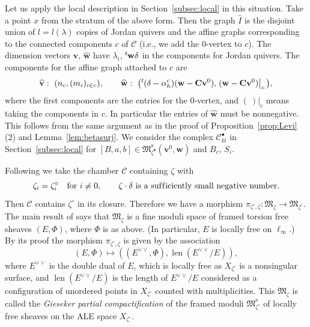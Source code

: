 \documentclass[pdftex]{sigma}
\theoremstyle{definition}
\numberwithin{equation}{section}
\newcommand{\lemref}[1]{Lemma~\ref{#1}}
\newcommand{\propref}[1]{Proposition~\ref{#1}}
\newcommand{\subsecref}[1]{Section~\ref{#1}}
\newcommand{\lsp}[2]{{\mskip-.3mu}{}^{#1}\mskip-1mu{#2}}
\newcommand{\M}{{\mathfrak M}} %
\newcommand{\Mreg}{\M^{\operatorname{s}}}
\newcommand{\bv}{{\mathbf v}} %
\newcommand{\bw}{{\mathbf w}} %
\newcommand{\bC}{{\mathbf C}} %
\newcommand{\linf}{\ell_\infty}
\begin{document}
Let us apply the local description in \subsecref{subsec:local} in this
situation. Take a point $x$ from the stratum of the above form. Then
the graph $\widehat{I}$ is the disjoint union of $l = l(\lambda)$
copies of Jordan quivers and the af\/f\/ine graphs corresponding to the
connected components $c$ of $\mathcal C$ (i.e., we add the $0$-vertex
to $c$).  The dimension vectors $\widehat{\bv}$, $\widehat{\bw}$ have
$\lambda_i$, $\lsp{t}{\bw}\delta$ in the components for Jordan
quivers. The components for the af\/f\/ine graph attached to $c$ are
\begin{equation}\label{eq:hatdim}
   \widehat{\bv} : \ (n_c, (m_i)_{i\in c}), \qquad
   \widehat{\bw} : \ \big( \lsp{t}{(\delta-\alpha^c_h)}(\bw - \bC\bv^0),
   \left.(\bw - \bC\bv^0)\right|_c\big),
\end{equation}
where the f\/irst components are the entries for the $0$-vertex, and
$\left.(\ )\right|_c$ means taking the components in $c$.
In particular the entries of $\widehat\bw$ must be nonnegative. This
follows from the same argument as in the proof of
\propref{prop:Levi}(2) and \lemref{lem:betasurj}. We consider the
complex $\mathscr{C}^\bullet_{kl}$ in \subsecref{subsec:local} for
$[B,a,b]\in \Mreg_{\zeta^\bullet}(\bv^0, \bw)$ and $B_c$, $S_i$.

Following \cite{Na-ADHM} we take the chamber $\mathcal C$ containing
$\zeta$ with
\begin{equation}\label{eq:zetasheaf}
   \zeta_i = \zeta_i^\circ \quad \text{for $i\neq 0$}, \qquad
   \text{$\zeta\cdot\delta$ is a suf\/f\/iciently small negative number}.
\end{equation}
Then $\mathcal C$ contains $\zeta^\circ$ in its closure. Therefore we
have a morphism $\pi_{\zeta^\circ,\zeta}\colon \M_{\zeta}\to
\M_{\zeta^\circ}$. The main result of \cite{Na-ADHM} says that
$\M_{\zeta}$ is a f\/ine moduli space of framed torsion free sheaves
$(E,\Phi)$, where $\Phi$ is as above. (In particular, $E$ is locally
free on $\linf$.) By its proof the morphism $\pi_{\zeta^\circ,\zeta}$
is given by the association
\[
   (E,\Phi) \mapsto ((E^{\vee\vee},\Phi), \operatorname{len}(E^{\vee\vee}/E)),
\]
where $E^{\vee\vee}$ is the double dual of $E$, which is locally free
as $X_{\zeta^\circ}$ is a nonsingular surface, and
$\operatorname{len}(E^{\vee\vee}/E)$ is the length of $E^{\vee\vee}/E$
considered as a conf\/iguration of unordered points in $X_{\zeta^\circ}$
counted with multiplicities.
This $\M_{\zeta}$ is called the {\it Gieseker partial
  compactification\/} of the framed moduli $\Mreg_{\zeta^\circ}$ of
locally free sheaves on the ALE space $X_{\zeta^\circ}$.
\end{document}
